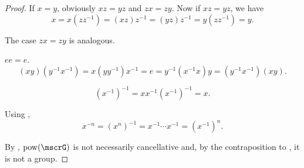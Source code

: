 \begin{proof}
   If \( x = y \), obviously \( xz = yz \) and \( zx = zy \). Now if \( xz = yz \), we have
  \begin{equation*}
    x = x(zz^{-1}) = (xz)z^{-1} = (yz)z^{-1} = y(zz^{-1}) = y.
  \end{equation*}

  The case \( zx = zy \) is analogous.

   \( ee = e \).
  \begin{equation*}
    (xy) (y^{-1} x^{-1})
    =
    x (y y^{-1}) x^{-1}
    =
    e
    =
    y^{-1} (x^{-1} x) y
    =
    (y^{-1} x^{-1}) (xy).
  \end{equation*}

  \begin{equation*}
    (x^{-1})^{-1}
    =
    x x^{-1} (x^{-1})^{-1}
    =
    x.
  \end{equation*}

   Using ,
  \begin{equation*}
    x^{-n}
    =
    (x^n)^{-1}
    =
    x^{-1} \cdots x^{-1}
    =
    (x^{-1})^n.
  \end{equation*}

   By , \( \pow(\mscrG) \) is not necessarily cancellative and, by the contraposition to , it is not a group.
\end{proof}

